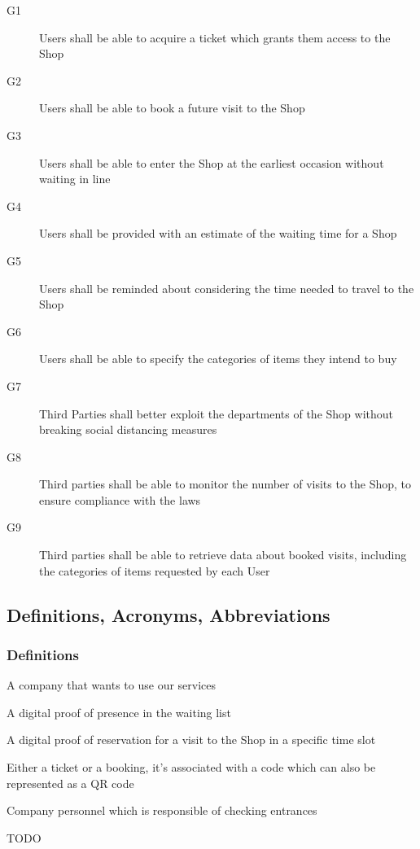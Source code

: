 \begin{description}
    \item [G1] Users shall be able to acquire a ticket which grants them access to the Shop
    \item [G2]  Users shall be able to book a future visit to the Shop
    \item [G3]  Users shall be able to enter the Shop at the earliest occasion without waiting in line
    \item [G4]  Users shall be provided with an estimate of the waiting time for a Shop
    \item [G5]  Users shall be reminded about considering the time needed to travel to the Shop
    \item [G6]  Users shall be able to specify the categories of items they intend to buy 
    \item [G7]  Third Parties shall better exploit the departments of the Shop without breaking social distancing measures
    \item [G8]  Third parties shall be able to monitor the number of visits to the Shop, to ensure compliance with the laws
    \item [G9] Third parties shall be able to retrieve data about booked visits, including the categories of items requested by each User 

\end{description}

\subsection{Definitions, Acronyms, Abbreviations}
\subsubsection{Definitions}
\begin{description}
    \item [Third party company] A company that wants to use our services
    \item [Ticket] A digital proof of presence in the waiting list
    \item [Booking] A digital proof of reservation for a visit to the Shop in a specific time slot
    \item [Token] Either a ticket or a booking, it's associated with a code which can also be represented as a QR code
    \item [Staff] Company personnel which is responsible of checking entrances
    {\todo
        \item \huge TODO
    }
\end{description}
